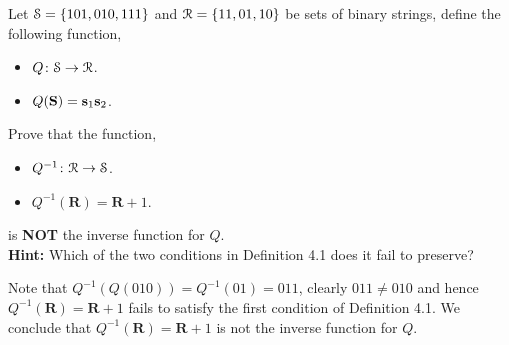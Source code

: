 \documentclass[12pt]{article} %
\begin{document}
\begin{qstn}[4][(3 marks)]
Let $\EuScript{S} = \{101,010,111\}$  and $\EuScript{R} = \{11,01,10\}$ be sets of binary strings, define the following function,
\begin{itemize}
    \item $Q \colon \EuScript{S} \to \EuScript{R}$.
    \item $Q(\textbf{S}) = \vb s_1 \vb s_2$.
\end{itemize}
Prove that the function,
\begin{itemize}
    \item $Q^{-1} \colon \EuScript{R} \to \EuScript{S}$.
    \item $Q^{-1}(\textbf{R}) = \textbf{R} + 1$.
\end{itemize}
is \textbf{NOT }the inverse function for $Q$.\\
\textbf{Hint:} Which of the two conditions in Definition 4.1 does it fail to preserve?

\begin{solution}
  Note that $Q^{-1}(Q(010)) = Q ^{-1}(01) = 011$, clearly $011 \neq 010$ and hence  $Q^{-1}(\textbf{R}) =
  \textbf{R} + 1$ fails to satisfy the first condition of Definition 4.1. We conclude that  $Q^{-1}(\textbf{R}) =
  \textbf{R} + 1$ is not the inverse function for $Q$.
\end{solution}

  
\end{qstn}
\end{document}
